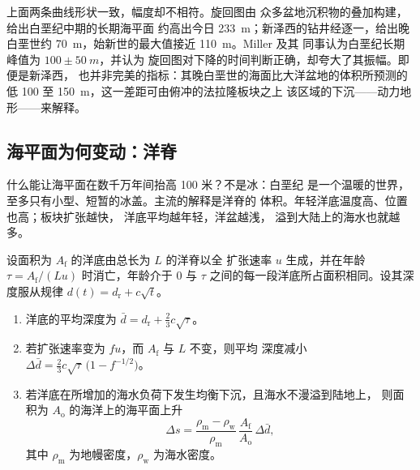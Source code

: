 上面两条曲线形状一致，幅度却不相符。旋回图由
众多盆地沉积物的叠加构建，给出白垩纪中期的长期海平面
约高出今日 \qty{233}{m}；新泽西的钻井经逐一，给出晚白垩世约
\qty{70}{m}，始新世的最大值接近 \qty{110}{m}。Miller 及其
同事认为白垩纪长期峰值为 $100 \pm \qty{50}{m}$，并认为
旋回图对下降的时间判断正确，却夸大了其振幅。即便是新泽西，
也并非完美的指标：其晚白垩世的海面比大洋盆地的体积所预测的
低 100 至 \qty{150}{m}，这一差距可由俯冲的法拉隆板块之上
该区域的下沉——动力地形——来解释。

\subsection*{海平面为何变动：洋脊}

什么能让海平面在数千万年间抬高 100 米？不是冰：白垩纪
是一个温暖的世界，至多只有小型、短暂的冰盖。主流的解释是洋脊的
体积。年轻洋底温度高、位置也高；板块扩张越快，
洋底平均越年轻，洋盆越浅，
溢到大陆上的海水也就越多。

\begin{proposition}[海平面与扩张速率]\label{prop:b2:phanerozoic-earth:ridge}
设面积为 $A_{\text{f}}$ 的洋底由总长为 $L$ 的洋脊以全
扩张速率 $u$ 生成，并在年龄 $\tau = A_{\text{f}}/(Lu)$ 时消亡，年龄介于 0
与 $\tau$ 之间的每一段洋底所占面积相同。设其深度服从规律 $d(t) = d_{\text{r}} + c\sqrt t$。
\begin{enumerate}
  \item 洋底的平均深度为 $\bar d = d_{\text{r}} + \tfrac23 c\sqrt\tau$。
  \item 若扩张速率变为 $fu$，而 $A_{\text{f}}$ 与 $L$ 不变，则平均
        深度减小 $\Delta\bar d = \tfrac23 c\sqrt\tau\,\bigl(1 - f^{-1/2}\bigr)$。
  \item 若洋底在所增加的海水负荷下发生均衡下沉，且海水不漫溢到陆地上，
        则面积为 $A_{\text{o}}$ 的海洋上的海平面上升
        \[
        \Delta s = \frac{\rho_{\text{m}} - \rho_{\text{w}}}{\rho_{\text{m}}}\,
        \frac{A_{\text{f}}}{A_{\text{o}}}\,\Delta\bar d ,
        \]
        其中 $\rho_{\text{m}}$ 为地幔密度，$\rho_{\text{w}}$ 为海水密度。
\end{enumerate}
\end{proposition}

